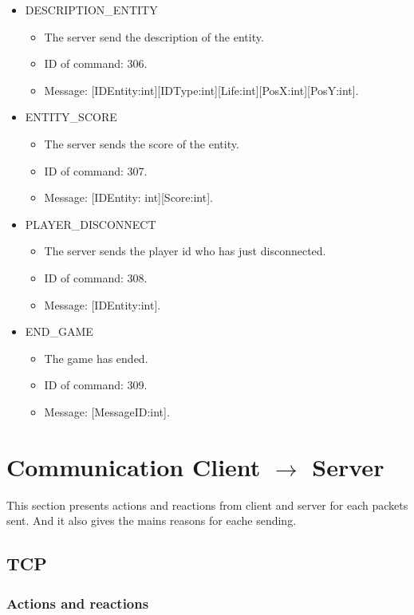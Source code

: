 \documentclass[a4 paper, 12pt]{report}
\begin{document}
\begin{itemize}
\item DESCRIPTION\_ENTITY
  \begin{itemize}
  \item The server send the description of the entity.
  \item ID of command: 306.
  \item Message: [IDEntity:int][IDType:int][Life:int][PosX:int][PosY:int].
  \end{itemize}

\item ENTITY\_SCORE
  \begin{itemize}
  \item The server sends the score of the entity.
  \item ID of command: 307.
  \item Message: [IDEntity: int][Score:int].
  \end{itemize}

\item PLAYER\_DISCONNECT
  \begin{itemize}
  \item The server sends the player id who has just disconnected.
  \item ID of command: 308.
  \item Message: [IDEntity:int].
  \end{itemize}

\item END\_GAME
  \begin{itemize}
  \item The game has ended.
  \item ID of command: 309.
  \item Message: [MessageID:int].
  \end{itemize}
\end{itemize}


\chapter{Communication Client $\rightarrow$ Server}

This section presents actions and reactions from client and server for each packets sent. And it also gives the mains reasons for eache sending.

\section{TCP}

\subsection{Actions and reactions}
\end{document}
